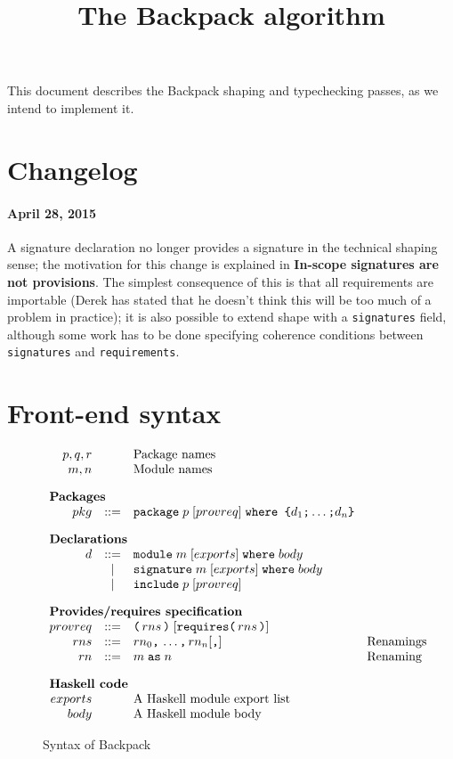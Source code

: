 \documentclass{article}
\title{The Backpack algorithm}
\begin{document}
\maketitle

This document describes the Backpack shaping and typechecking
passes, as we intend to implement it.

\section{Changelog}

\paragraph{April 28, 2015}  A signature declaration no longer provides
a signature in the technical shaping sense; the motivation for this change
is explained in \textbf{In-scope signatures are not provisions}.  The simplest
consequence of this is that all requirements are importable (Derek has stated that he doesn't
think this will be too much of a problem in practice); it is also possible to
extend shape with a \verb|signatures| field, although some work has to be
done specifying coherence conditions between \verb|signatures| and \verb|requirements|.

\section{Front-end syntax}

\begin{figure}[htpb]
$$
\begin{array}{rcll}
p,q,r && \mbox{Package names} \\
m,n   && \mbox{Module names} \\[1em]
\multicolumn{3}{l}{\mbox{\bf Packages}} \\
  pkg & ::= & \verb|package|\; p\; [provreq]\; \verb|where {| d_1 \verb|;| \ldots \verb|;| d_n \verb|}| \\[1em]
\multicolumn{3}{l}{\mbox{\bf Declarations}} \\
  d & ::= & \verb|module|\;    m \; [exports]\; \verb|where|\; body \\
    & |   & \verb|signature|\; m \; [exports]\; \verb|where|\; body \\
    & |   & \verb|include|\; p \; [provreq] \\[1em]
\multicolumn{3}{l}{\mbox{\bf Provides/requires specification}} \\
provreq & ::= & \verb|(| \, rns \, \verb|)| \; 
        [ \verb|requires(|\, rns \, \verb|)| ] \\
rns & ::= & rn_0 \verb|,| \, \ldots \verb|,| \, rn_n [\verb|,|] & \mbox{Renamings} \\
rn & ::= & m\; \verb|as| \; n & \mbox{Renaming} \\[1em] 
\multicolumn{3}{l}{\mbox{\bf Haskell code}} \\
exports & & \mbox{A Haskell module export list} \\
body    & & \mbox{A Haskell module body} \\
\end{array}
$$
\caption{Syntax of Backpack} \label{fig:syntax}
\end{figure}
\end{document}
